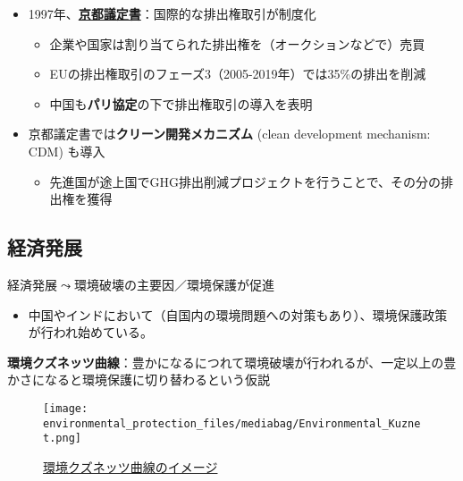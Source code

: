 \documentclass[
  xelatex,
  ja=standard]{bxjsarticle}
\providecommand{\tightlist}{%
  \setlength{\itemsep}{0pt}\setlength{\parskip}{0pt}}\usepackage{longtable,booktabs,array}
\begin{document}
\begin{itemize}
\tightlist
\item
  1997年、\href{https://www.env.go.jp/earth/cop6/3-2.html}{\textbf{京都議定書}}：国際的な排出権取引が制度化

  \begin{itemize}
  \tightlist
  \item
    企業や国家は割り当てられた排出権を（オークションなどで）売買
  \item
    EUの排出権取引のフェーズ3（2005-2019年）では35\%の排出を削減
  \item
    中国も\textbf{パリ協定}の下で排出権取引の導入を表明
  \end{itemize}
\item
  京都議定書では\textbf{クリーン開発メカニズム} (clean development
  mechanism: CDM) も導入

  \begin{itemize}
  \tightlist
  \item
    先進国が途上国でGHG排出削減プロジェクトを行うことで、その分の排出権を獲得
  \end{itemize}
\end{itemize}

\hypertarget{ux7d4cux6e08ux767aux5c55}{%
\subsection{経済発展}\label{ux7d4cux6e08ux767aux5c55}}

経済発展\(\leadsto\)環境破壊の主要因／環境保護が促進

\begin{itemize}
\tightlist
\item
  中国やインドにおいて（自国内の環境問題への対策もあり）、環境保護政策が行われ始めている。
\end{itemize}

\textbf{環境クズネッツ曲線}：豊かになるにつれて環境破壊が行われるが、一定以上の豊かさになると環境保護に切り替わるという仮説

\begin{figure}[htpb]

{\centering \texttt{[image: environmental\_protection\_files/mediabag/Environmental\_Kuznet.png]}

}

\caption{\href{https://commons.wikimedia.org/wiki/File:Environmental_Kuznets_Curve.png}{環境クズネッツ曲線のイメージ}}

\end{figure}
\end{document}
